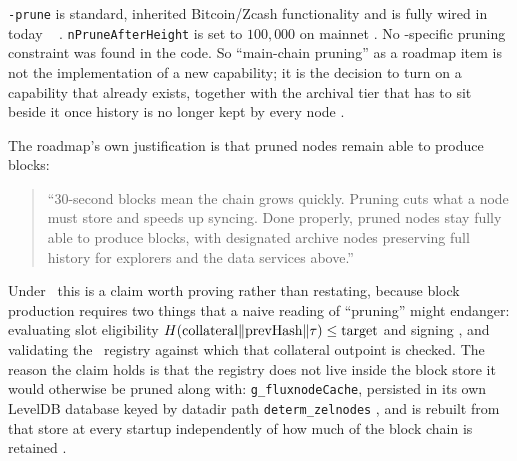 \texttt{-prune} is standard, inherited Bitcoin/Zcash functionality and is fully wired in \fluxd today
\shipped\  .
\texttt{n\allowbreak{}Prune\allowbreak{}After\allowbreak{}Height} is set to $100{,}000$ on mainnet . No
\PoN-specific pruning constraint was found in the code. So ``main-chain pruning'' as a roadmap item is
not the implementation of a new capability; it is the decision to turn on a capability that already
exists, together with the archival tier that has to sit beside it once history is no longer kept by
every node .

The roadmap's own justification is that pruned nodes remain able to produce blocks:

\begin{quote}
``30-second blocks mean the chain grows quickly. Pruning cuts what a node must store and speeds up
syncing. Done properly, pruned nodes stay fully able to produce blocks, with designated archive nodes
preserving full history for explorers and the data services above.''
\end{quote}

Under \PoN\ this is a claim worth proving rather than restating, because block production requires two
things that a naive reading of ``pruning'' might endanger: evaluating slot eligibility
$H(\text{collateral} \Vert \text{prevHash} \Vert \tau) \le \text{target}$ and signing
, and validating the \FluxNode\ registry against which that
collateral outpoint is checked. The reason the claim holds is that the registry does not live inside
the block store it would otherwise be pruned along with: 
\texttt{g\_fluxnode\allowbreak{}Cache}, persisted in its own LevelDB database keyed by datadir path
\texttt{determ\_zelnodes} , and is rebuilt from that
store at every startup independently of how much of the block chain is retained
.

